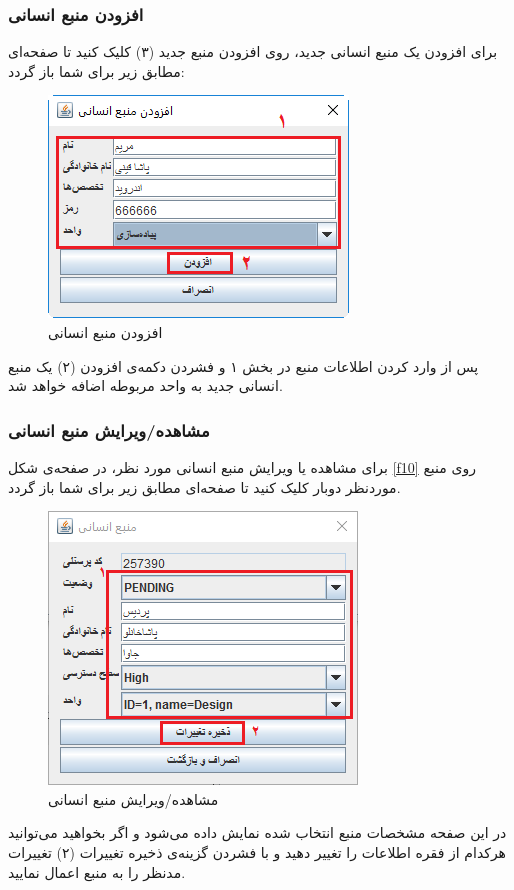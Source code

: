 \subsubsection{افزودن منبع انسانی}
برای افزودن یک منبع انسانی جدید، روی افزودن منبع جدید (۳) کلیک کنید تا صفحه‌ای مطابق زیر برای شما باز گردد:
	\begin{figure}[H]
		\centering
		\includegraphics[scale=0.9]{img/manual/addHRess}
		\caption{افزودن منبع انسانی}
	\end{figure}
پس از وارد کردن اطلاعات منبع در بخش ۱ و فشردن دکمه‌ی افزودن (۲) یک منبع انسانی جدید به واحد مربوطه اضافه خواهد شد.

\subsubsection{مشاهده/ویرایش منبع انسانی}
برای مشاهده یا ویرایش منبع انسانی مورد نظر، در صفحه‌ی شکل
\ref{f10}
 روی منبع موردنظر دوبار کلیک کنید تا صفحه‌ای مطابق زیر برای شما باز گردد.

	\begin{figure}[H]
		\centering
		\includegraphics[scale=0.9]{img/manual/editHRess}
		\caption{مشاهده/ویرایش منبع انسانی}
		\label{f20}
	\end{figure} 
در این صفحه مشخصات منبع انتخاب شده نمایش داده می‌شود و اگر بخواهید می‌توانید هرکدام از فقره اطلاعات را تغییر دهید و با فشردن گزینه‌ی ذخیره تغییرات (۲) تغییرات مدنظر را به منبع اعمال نمایید.

